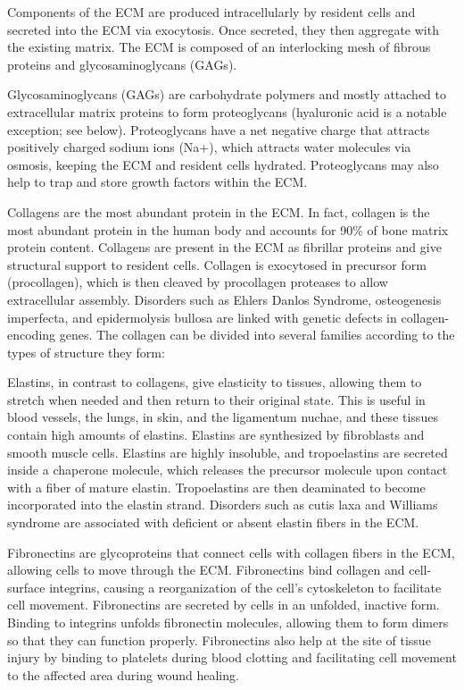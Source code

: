 Components of the ECM are produced intracellularly by resident cells and secreted into the ECM via exocytosis. Once secreted, they then aggregate with the existing matrix. The ECM is composed of an interlocking mesh of fibrous proteins and glycosaminoglycans (GAGs).

Glycosaminoglycans (GAGs) are carbohydrate polymers and mostly attached to extracellular matrix proteins to form proteoglycans (hyaluronic acid is a notable exception; see below). Proteoglycans have a net negative charge that attracts positively charged sodium ions (Na+), which attracts water molecules via osmosis, keeping the ECM and resident cells hydrated. Proteoglycans may also help to trap and store growth factors within the ECM.

Collagens are the most abundant protein in the ECM. In fact, collagen is the most abundant protein in the human body and accounts for 90\% of bone matrix protein content. Collagens are present in the ECM as fibrillar proteins and give structural support to resident cells. Collagen is exocytosed in precursor form (procollagen), which is then cleaved by procollagen proteases to allow extracellular assembly. Disorders such as Ehlers Danlos Syndrome, osteogenesis imperfecta, and epidermolysis bullosa are linked with genetic defects in collagen-encoding genes. The collagen can be divided into several families according to the types of structure they form:

Elastins, in contrast to collagens, give elasticity to tissues, allowing them to stretch when needed and then return to their original state. This is useful in blood vessels, the lungs, in skin, and the ligamentum nuchae, and these tissues contain high amounts of elastins. Elastins are synthesized by fibroblasts and smooth muscle cells. Elastins are highly insoluble, and tropoelastins are secreted inside a chaperone molecule, which releases the precursor molecule upon contact with a fiber of mature elastin. Tropoelastins are then deaminated to become incorporated into the elastin strand. Disorders such as cutis laxa and Williams syndrome are associated with deficient or absent elastin fibers in the ECM.

Fibronectins are glycoproteins that connect cells with collagen fibers in the ECM, allowing cells to move through the ECM. Fibronectins bind collagen and cell-surface integrins, causing a reorganization of the cell's cytoskeleton to facilitate cell movement. Fibronectins are secreted by cells in an unfolded, inactive form. Binding to integrins unfolds fibronectin molecules, allowing them to form dimers so that they can function properly. Fibronectins also help at the site of tissue injury by binding to platelets during blood clotting and facilitating cell movement to the affected area during wound healing.

